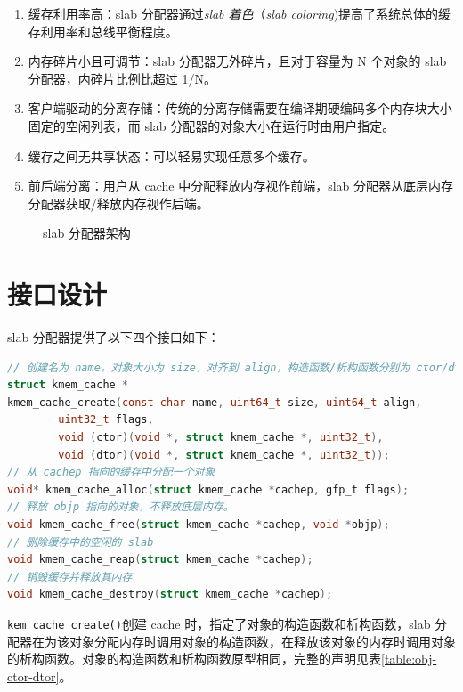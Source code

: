 \documentclass[AutoFakeBold]{LZUThesis}
\begin{document}
\begin{sloppypar}
\begin{enumerate}
\def\labelenumi{\arabic{enumi}.}
\item
  缓存利用率高：slab 分配器通过\emph{slab 着色}（\emph{slab
  coloring})提高了系统总体的缓存利用率和总线平衡程度。
\item
  内存碎片小且可调节：slab 分配器无外碎片，且对于容量为 N 个对象的 slab
  分配器，内碎片比例比超过 1/N。
\item
  客户端驱动的分离存储：传统的分离存储需要在编译期硬编码多个内存块大小固定的空闲列表，而
  slab 分配器的对象大小在运行时由用户指定。
\item
  缓存之间无共享状态：可以轻易实现任意多个缓存。
\item
  前后端分离：用户从 cache 中分配释放内存视作前端，slab
  分配器从底层内存分配器获取/释放内存视作后端。
\end{enumerate}

\begin{figure}
\centering

\caption{slab 分配器架构}
\end{figure}


\section{接口设计}

slab 分配器提供了以下四个接口如下：

\begin{lstlisting}[language = c]
// 创建名为 name，对象大小为 size，对齐到 align，构造函数/析构函数分别为 ctor/dtor 的缓存。
struct kmem_cache *
kmem_cache_create(const char name, uint64_t size, uint64_t align,
        uint32_t flags,
        void (ctor)(void *, struct kmem_cache *, uint32_t),
        void (dtor)(void *, struct kmem_cache *, uint32_t));
// 从 cachep 指向的缓存中分配一个对象
void* kmem_cache_alloc(struct kmem_cache *cachep, gfp_t flags);
// 释放 objp 指向的对象，不释放底层内存。
void kmem_cache_free(struct kmem_cache *cachep, void *objp);
// 删除缓存中的空闲的 slab
void kmem_cache_reap(struct kmem_cache *cachep);
// 销毁缓存并释放其内存
void kmem_cache_destroy(struct kmem_cache *cachep);

\end{lstlisting}

\texttt{kem\_cache\_create()}创建 cache
时，指定了对象的构造函数和析构函数，slab
分配器在为该对象分配内存时调用对象的构造函数，在释放该对象的内存时调用对象的析构函数。对象的构造函数和析构函数原型相同，完整的声明见表\ref{table:obj-ctor-dtor}。


\end{sloppypar}
\end{document}
